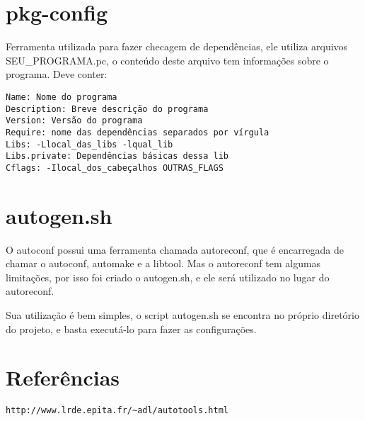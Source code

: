 \documentclass[]{article}
\begin{document}
\section{pkg-config}
Ferramenta utilizada para fazer checagem de dependências, ele utiliza arquivos SEU\_PROGRAMA.pc, o conteúdo deste arquivo tem informações sobre o programa.
Deve conter:
\begin{verbatim}
Name: Nome do programa
Description: Breve descrição do programa
Version: Versão do programa
Require: nome das dependências separados por vírgula
Libs: -Llocal_das_libs -lqual_lib
Libs.private: Dependências básicas dessa lib
Cflags: -Ilocal_dos_cabeçalhos OUTRAS_FLAGS
\end{verbatim}

\section{autogen.sh}
O autoconf possui uma ferramenta chamada autoreconf, que é encarregada de chamar o autoconf, automake e a libtool.
Mas o autoreconf tem algumas limitações, por isso foi criado o autogen.sh, e ele será utilizado no lugar do autoreconf.

Sua utilização é bem simples, o script autogen.sh se encontra no próprio diretório do projeto, e basta executá-lo para fazer as configurações.

\section{Referências}
\begin{verbatim}
http://www.lrde.epita.fr/~adl/autotools.html
\end{verbatim}
\end{document}
